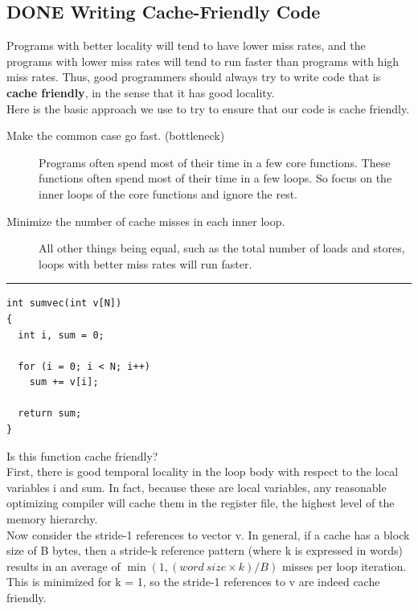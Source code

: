 \documentclass[11pt]{article}
\begin{document}
\subsection{{\bfseries\sffamily DONE} Writing Cache-Friendly Code}
\label{sec:org1cb23cf}
Programs with better locality will tend to have lower miss rates, and the programs with lower miss rates will tend to run faster than programs with high miss rates. Thus, good programmers should always try to write code that is \textbf{cache friendly}, in the sense that it has good locality.\\

Here is the basic approach we use to try to ensure that our code is cache friendly.\\
\begin{description}
\item[{Make the common case go fast. (bottleneck)}] Programs often spend most of their time in a few core functions. These functions often spend most of their time in a few loops. So focus on the inner loops of the core functions and ignore the rest.\\
\item[{Minimize the number of cache misses in each inner loop.}] All other things being equal, such as the total number of loads and stores, loops with better miss rates will run faster.\\
\end{description}


\noindent\rule{\textwidth}{0.5pt}
\begin{verbatim}
int sumvec(int v[N])
{
  int i, sum = 0;

  for (i = 0; i < N; i++)
    sum += v[i];

  return sum;
}

\end{verbatim}

Is this function cache friendly?\\

First, there is good temporal locality in the loop body with respect to the local variables i and sum. In fact, because these are local variables, any reasonable optimizing compiler will cache them in the register file, the highest level of the memory hierarchy.\\

Now consider the stride-1 references to vector v. In general, if a cache has a block size of B bytes, then a stride-k reference pattern (where k is expressed in words) results in an average of \(\min(1, (word\ size \times k)/B)\) misses per loop iteration. This is minimized for k = 1, so the stride-1 references to v are indeed cache friendly.\\
\end{document}
